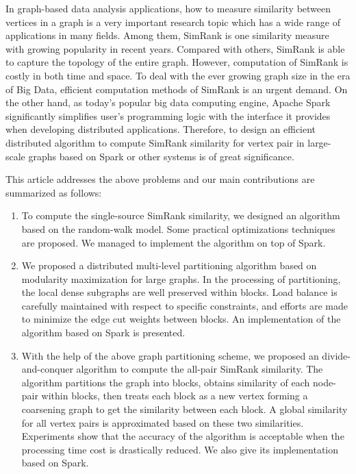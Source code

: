 \documentclass[master]{njuthesis}
\begin{document}
\begin{englishabstract}
In graph-based data analysis applications, how to measure similarity between vertices in a graph is a
very important research topic which has a wide range of applications in many fields.
Among them, SimRank is one similarity measure with growing popularity in recent years.
Compared with others, SimRank is able to capture the topology of the entire graph. 
However, computation of SimRank is costly in both time and space.
To deal with the ever growing graph size in the era of Big Data, 
efficient computation methods of SimRank is an urgent demand.
On the other hand, as today's popular big data computing engine, Apache Spark significantly simplifies user's programming logic
with the interface it provides when developing distributed applications. 
Therefore, to design an efficient distributed algorithm to compute SimRank similarity for vertex pair in large-scale graphs
based on Spark or other systems is of great significance.

This article addresses the above problems and our main contributions are summarized as follows:
\begin{enumerate}
 \item To compute the single-source SimRank similarity, we designed an algorithm based on the random-walk model.
 Some practical optimizations techniques are proposed. We managed to implement the algorithm on top of Spark.
 \item We proposed a distributed multi-level  partitioning algorithm based on modularity maximization for large graphs.
 In the processing of partitioning, the local dense subgraphs are well preserved within blocks.
 Load balance is carefully maintained with respect to specific constraints, 
 and efforts are made to minimize the edge cut weights between blocks. 
 An implementation of the algorithm based on Spark is presented.
 \item With the help of the above graph partitioning scheme, we proposed an divide-and-conquer algorithm to 
 compute the all-pair SimRank similarity.
 The algorithm partitions the graph into blocks, obtains similarity of each node-pair within blocks, then treats each 
 block as a new vertex forming a coarsening graph to get the similarity between each block. 
 A global similarity for all vertex pairs is approximated based on these two similarities.
 Experiments show that the accuracy of the algorithm is acceptable when the processing time cost is drastically reduced.
 We also give its implementation based on Spark.
\end{enumerate}

\end{englishabstract}
\end{document}
